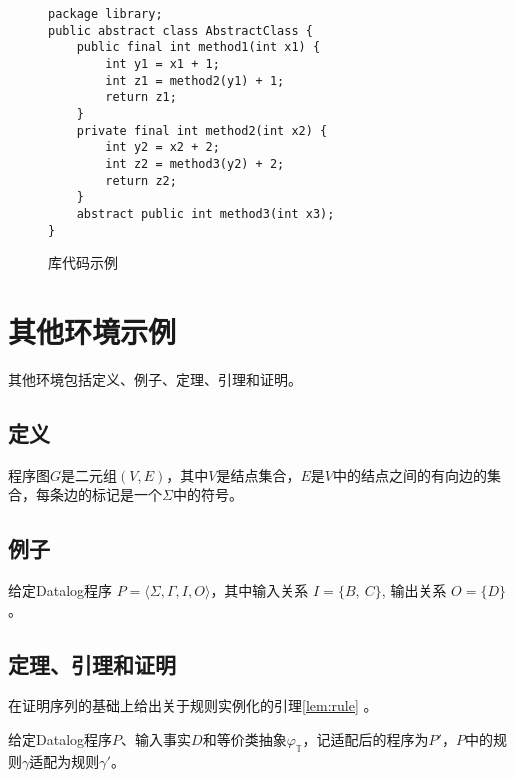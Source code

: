 \begin{figure}[htbp]
\begin{lstlisting}
package library;
public abstract class AbstractClass {
	public final int method1(int x1) {
		int y1 = x1 + 1;
		int z1 = method2(y1) + 1;
		return z1;
	}
	private final int method2(int x2) {
		int y2 = x2 + 2;
		int z2 = method3(y2) + 2;
		return z2;
	}
	abstract public int method3(int x3);
}
\end{lstlisting}
\caption{库代码示例}\label{fig:AbsClass}
\end{figure}

\section{其他环境示例}

其他环境包括定义、例子、定理、引理和证明。

\subsection{定义}

\begin{definition}[程序图]
程序图$G$是二元组$(V, E)$，其中$V$是结点集合，$E$是$V$中的结点之间的有向边的集合，每条边的标记是一个$\Sigma$中的符号。
\end{definition}

\subsection{例子}

\begin{example}
给定Datalog程序 $P = \langle \Sigma, \Gamma, I, O \rangle$，其中输入关系 $I = \{B,~C\}$, 输出关系 $O = \{D\}$。
\end{example}

\subsection{定理、引理和证明}

在证明序列的基础上给出关于规则实例化的引理\ref{lem:rule} 。

\newcommand{\vphi}[1]{\varphi_\mathbb{T}(#1)}
\newcommand{\rulesym}{::=}

\begin{lemma}\label{lem:rule} 
给定Datalog程序$P$、输入事实$D$和等价类抽象$\varphi_\mathbb{T}$，记适配后的程序为$P'$，$P$中的规则$\gamma$适配为规则$\gamma'$。
\end{lemma}

